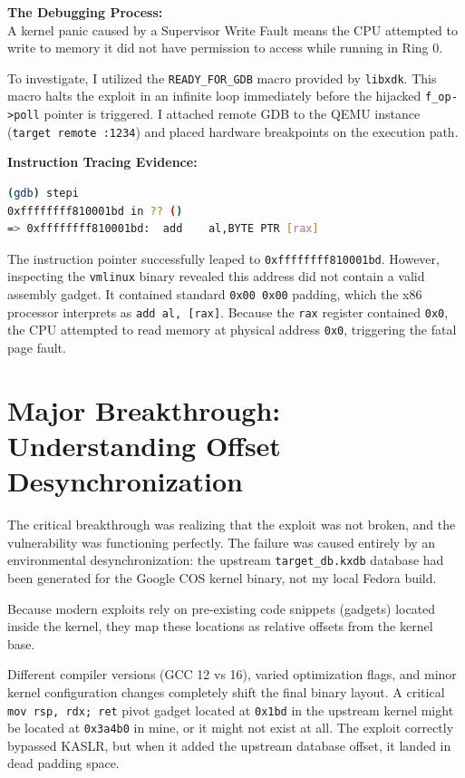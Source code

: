 \documentclass[11pt,a4paper]{article}
\begin{document}
\textbf{The Debugging Process:}\\
A kernel panic caused by a Supervisor Write Fault means the CPU attempted to write to memory it did not have permission to access while running in Ring 0. 

To investigate, I utilized the \texttt{READY\_FOR\_GDB} macro provided by \texttt{libxdk}. This macro halts the exploit in an infinite loop immediately before the hijacked \texttt{f\_op->poll} pointer is triggered. I attached remote GDB to the QEMU instance (\texttt{target remote :1234}) and placed hardware breakpoints on the execution path.

\textbf{Instruction Tracing Evidence:}
\begin{lstlisting}[language=bash]
(gdb) stepi
0xffffffff810001bd in ?? ()
=> 0xffffffff810001bd:  add    al,BYTE PTR [rax]
\end{lstlisting}

The instruction pointer successfully leaped to \texttt{0xffffffff810001bd}. However, inspecting the \texttt{vmlinux} binary revealed this address did not contain a valid assembly gadget. It contained standard \texttt{0x00 0x00} padding, which the x86 processor interprets as \texttt{add al, [rax]}. Because the \texttt{rax} register contained \texttt{0x0}, the CPU attempted to read memory at physical address \texttt{0x0}, triggering the fatal page fault.

\clearpage

\section{Major Breakthrough: Understanding Offset Desynchronization}
The critical breakthrough was realizing that the exploit was not broken, and the vulnerability was functioning perfectly. The failure was caused entirely by an environmental desynchronization: the upstream \texttt{target\_db.kxdb} database had been generated for the Google COS kernel binary, not my local Fedora build.

Because modern exploits rely on pre-existing code snippets (gadgets) located inside the kernel, they map these locations as relative offsets from the kernel base. 

Different compiler versions (GCC 12 vs 16), varied optimization flags, and minor kernel configuration changes completely shift the final binary layout. A critical \texttt{mov rsp, rdx; ret} pivot gadget located at \texttt{0x1bd} in the upstream kernel might be located at \texttt{0x3a4b0} in mine, or it might not exist at all. The exploit correctly bypassed KASLR, but when it added the upstream database offset, it landed in dead padding space.
\end{document}
